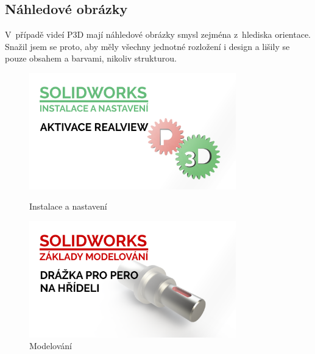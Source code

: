 \subsection{Náhledové obrázky}
V~případě videí P3D mají náhledové obrázky smysl zejména z~hlediska orientace.
Snažil jsem se proto, aby měly všechny jednotné rozložení i design a lišily se pouze obsahem a barvami, nikoliv strukturou.
\begin{figure}[htbp]
    \centering
    \begin{minipage}[b]{0.45\textwidth}
        \centering
        \includegraphics[width=0.8\textwidth]{img/020/aktivace-realview-thumbnail.png}
        \caption{Instalace a nastavení}
        \label{fig:thumb1}
    \end{minipage}
    \qquad
    \begin{minipage}[b]{0.45\textwidth}
        \centering
        \includegraphics[width=0.8\textwidth]{img/020/perodr-hr-thumbnail.png}
        \caption{Modelování}
        \label{fig:thumb2}
    \end{minipage}
\end{figure}

